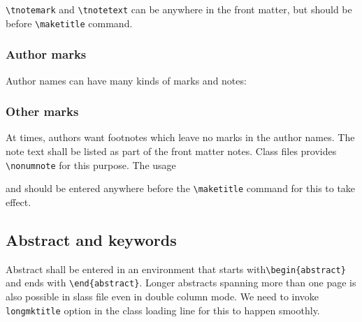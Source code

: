 \documentclass[a4paper,12pt]{article}
\begin{document}
\verb+\tnotemark+ and \verb+\tnotetext+ can be anywhere in
the front matter, but should be before \verb+\maketitle+ command.

\subsubsection{Author marks}

Author names can have many kinds of marks and notes:


\subsubsection{Other marks}

At times, authors want footnotes which leave no marks in
the author names. The note text shall be listed as part of
the front matter notes. Class files provides
\verb+\nonumnote+ for this purpose. The usage

\begin{vquote}
\end{vquote}

\noindent and should be entered anywhere before the \verb+\maketitle+
command for this to take effect. 

\subsection{Abstract and keywords}

Abstract shall be entered in an environment that starts
with\break \verb+\begin{abstract}+ and ends with
\verb+\end{abstract}+. Longer abstracts spanning more than
one page is also possible in slass file even in double
column mode. We need to invoke \verb+longmktitle+ option in the
class loading line for this to happen smoothly.
\end{document}
